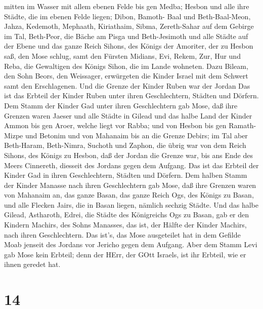 mitten im Wasser mit allem ebenen Felde bis gen Medba; 
Hesbon und alle ihre Städte, die im ebenen Felde liegen; Dibon, Bamoth-
Baal und Beth-Baal-Meon,  Jahza, Kedemoth, Mephaath,
 Kiriathaim, Sibma, Zereth-Sahar auf dem Gebirge im Tal,
 Beth-Peor, die Bäche am Pisga und Beth-Jesimoth
 und alle Städte auf der Ebene und das ganze Reich Sihons,
des Königs der Amoriter, der zu Hesbon saß, den Mose schlug, samt den
Fürsten Midians, Evi, Rekem, Zur, Hur und Reba, die Gewaltigen des
Königs Sihon, die im Lande wohneten.  Dazu Bileam, den Sohn
Beors, den Weissager, erwürgeten die Kinder Israel mit dem Schwert samt
den Erschlagenen.  Und die Grenze der Kinder Ruben war der
Jordan Das ist das Erbteil der Kinder Ruben unter ihren Geschlechtern,
Städten und Dörfern.  Dem Stamm der Kinder Gad unter ihren
Geschlechtern gab Mose,  daß ihre Grenzen waren Jaeser und
alle Städte in Gilead und das halbe Land der Kinder Ammon bis gen Aroer,
welche liegt vor Rabba;  und von Hesbon bis gen
Ramath-Mizpe und Betonim und von Mahanaim bis an die Grenze Debirs;
 im Tal aber Beth-Haram, Beth-Nimra, Suchoth und Zaphon,
die übrig war von dem Reich Sihons, des Königs zu Hesbon, daß der Jordan
die Grenze war, bis ans Ende des Meers Cinnereth, diesseit des Jordans
gegen dem Aufgang.  Das ist das Erbteil der Kinder Gad in
ihren Geschlechtern, Städten und Dörfern.  Dem halben Stamm
der Kinder Manasse nach ihren Geschlechtern gab Mose,  daß
ihre Grenzen waren von Mahanaim an, das ganze Basan, das ganze Reich
Ogs, des Königs zu Basan, und alle Flecken Jairs, die in Basan liegen,
nämlich sechzig Städte.  Und das halbe Gilead, Astharoth,
Edrei, die Städte des Königreichs Ogs zu Basan, gab er den Kindern
Machirs, des Sohns Manasses, das ist, der Hälfte der Kinder Machirs,
nach ihren Geschlechtern.  Das ist's, das Mose ausgeteilet
hat in dem Gefilde Moab jenseit des Jordans vor Jericho gegen dem
Aufgang.  Aber dem Stamm Levi gab Mose kein Erbteil; denn
der HErr, der GOtt Israels, ist ihr Erbteil, wie er ihnen geredet hat.

\hypertarget{section-13}{%
\section{14}\label{section-13}}

